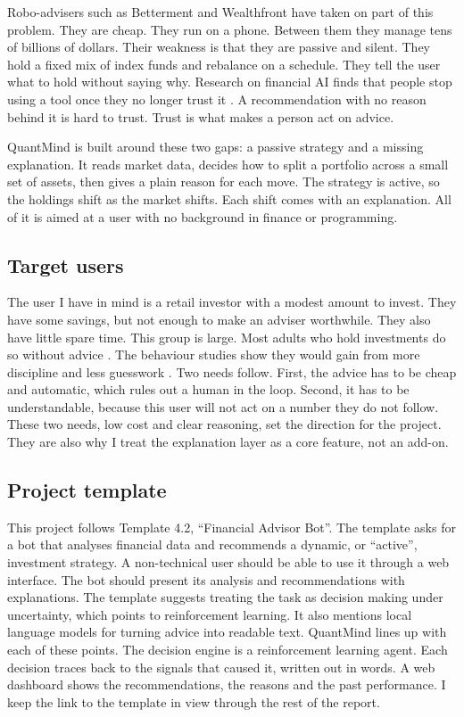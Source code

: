\documentclass[12pt,twoside,letterpaper]{article}
\begin{document}
Robo-advisers such as Betterment and Wealthfront have taken on part of this problem.
They are cheap. They run on a phone. Between them they manage tens of billions of
dollars. Their weakness is that they are passive and silent. They hold a fixed mix
of index funds and rebalance on a schedule. They tell the user what to hold without
saying why. Research on financial AI finds that people stop using a tool once they
no longer trust it \cite{meske2022}. A recommendation with no reason behind it is
hard to trust. Trust is what makes a person act on advice.

QuantMind is built around these two gaps: a passive strategy and a missing
explanation. It reads market data, decides how to split a portfolio across a small
set of assets, then gives a plain reason for each move. The strategy is active, so
the holdings shift as the market shifts. Each shift comes with an explanation. All
of it is aimed at a user with no background in finance or programming.

\subsection{Target users}

The user I have in mind is a retail investor with a modest amount to invest. They
have some savings, but not enough to make an adviser worthwhile. They also have
little spare time. This group is large. Most adults who hold investments do so
without advice \cite{fca2023}. The behaviour studies show they would gain from more
discipline and less guesswork \cite{barber2000}. Two needs follow. First, the
advice has to be cheap and automatic, which rules out a human in the loop. Second,
it has to be understandable, because this user will not act on a number they do not
follow. These two needs, low cost and clear reasoning, set the direction for the
project. They are also why I treat the explanation layer as a core feature, not an
add-on.

\subsection{Project template}

This project follows Template 4.2, ``Financial Advisor Bot''. The template asks for
a bot that analyses financial data and recommends a dynamic, or ``active'',
investment strategy. A non-technical user should be able to use it through a web
interface. The bot should present its analysis and recommendations with
explanations. The template suggests treating the task as decision making under
uncertainty, which points to reinforcement learning. It also mentions local
language models for turning advice into readable text. QuantMind lines up with each
of these points. The decision engine is a reinforcement learning agent. Each
decision traces back to the signals that caused it, written out in words. A web
dashboard shows the recommendations, the reasons and the past performance. I keep
the link to the template in view through the rest of the report.
\end{document}
